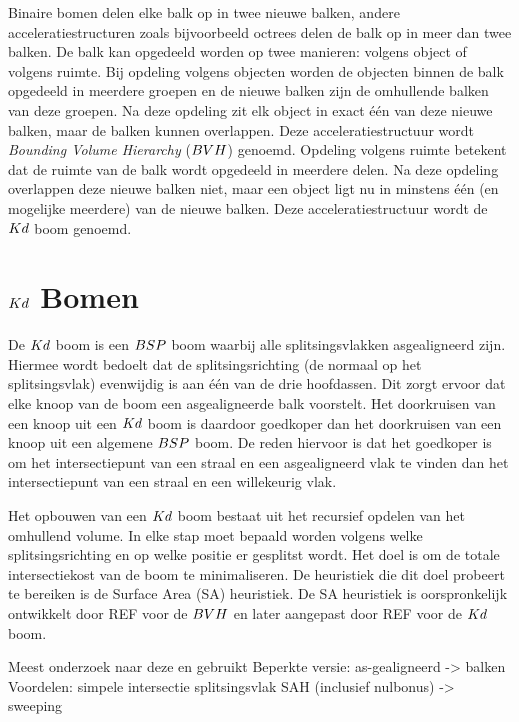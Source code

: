     Binaire bomen delen elke balk op in twee nieuwe balken, andere acceleratiestructuren zoals bijvoorbeeld octrees delen de balk op in meer dan twee balken.
    De balk kan opgedeeld worden op twee manieren: volgens object of volgens ruimte.
    Bij opdeling volgens objecten worden de objecten binnen de balk opgedeeld in meerdere groepen en de nieuwe balken zijn de omhullende balken van deze groepen.
    Na deze opdeling zit elk object in exact één van deze nieuwe balken, maar de balken kunnen overlappen.
    Deze acceleratiestructuur wordt \textit{Bounding Volume Hierarchy} ($BVH$) genoemd.
    Opdeling volgens ruimte betekent dat de ruimte van de balk wordt opgedeeld in meerdere delen.
    Na deze opdeling overlappen deze nieuwe balken niet, maar een object ligt nu in minstens één (en mogelijke meerdere) van de nieuwe balken.
    Deze acceleratiestructuur wordt de ${Kd}$ boom genoemd.

\section{$Kd$ Bomen}    
    De $Kd$ boom is een $BSP$ boom waarbij alle splitsingsvlakken asgealigneerd zijn.
    Hiermee wordt bedoelt dat de splitsingsrichting (de normaal op het splitsingsvlak) evenwijdig is aan één van de drie hoofdassen.
    Dit zorgt ervoor dat elke knoop van de boom een asgealigneerde balk voorstelt.
    Het doorkruisen van een knoop uit een $Kd$ boom is daardoor goedkoper dan het doorkruisen van een knoop uit een algemene $BSP$ boom.
    De reden hiervoor is dat het goedkoper is om het intersectiepunt van een straal en een asgealigneerd vlak te vinden dan het intersectiepunt van een straal en een willekeurig vlak.

    Het opbouwen van een $Kd$ boom bestaat uit het recursief opdelen van het omhullend volume.
    In elke stap moet bepaald worden volgens welke splitsingsrichting en op welke positie er gesplitst wordt.
    Het doel is om de totale intersectiekost van de boom te minimaliseren. 
    De heuristiek die dit doel probeert te bereiken is de Surface Area (SA) heuristiek.
    De SA heuristiek is oorspronkelijk ontwikkelt door REF voor de $BVH$ en later aangepast door REF voor de $Kd$ boom.



    Meest onderzoek naar deze en gebruikt
    Beperkte versie: as-gealigneerd -> balken
    Voordelen: simpele intersectie splitsingsvlak
    SAH (inclusief nulbonus) -> sweeping
